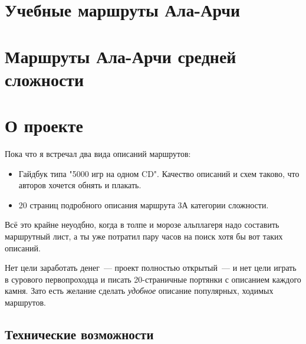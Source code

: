 \documentclass[11pt,fleqn]{report} %
\begin{document}
\tableofcontents

\chapter{Учебные маршруты Ала-Арчи}

\routeListEasyAlaArcha

\chapter{Маршруты Ала-Арчи средней сложности}

\routeListMiddleAlaArcha

\chapter{О проекте}

\newcommand{\gitRepo}[0]{\href{https://github.com/johnlepikhin/alpine-guidebook}{GitHub}}

Пока что я встречал два вида описаний маршрутов:
\begin{itemize}
\item Гайдбук типа "5000 игр на одном CD". Качество описаний и схем
  таково, что авторов хочется обнять и плакать.
\item 20 страниц подробного описания маршрута 3А категории сложности.
\end{itemize}

Всё это крайне неуодбно, когда в толпе и морозе альплагеря надо
составить маршрутный лист, а ты уже потратил пару часов на поиск хотя
бы вот таких описаний.

Нет цели заработать денег~--- проект полностью открытый~--- и нет цели
играть в сурового первопроходца и писать 20-страничные портянки с
описанием каждого камня. Зато есть желание сделать \textit{удобное}
описание популярных, ходимых маршрутов.

\section{Технические возможности}
\end{document}
